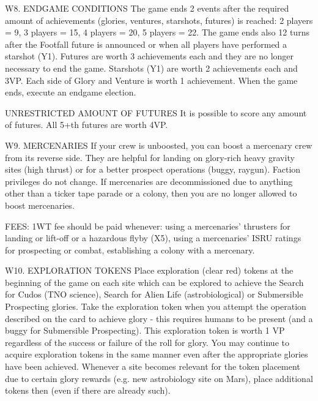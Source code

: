 \documentclass[a4paper]{book}
\begin{document}
W8. ENDGAME CONDITIONS
The game ends 2 events after the required amount of achievements (glories, ventures, starshots, futures) is reached: 2 players = 9, 3 players = 15, 4 players = 20, 5 players = 22. The game ends also 12 turns after the Footfall future is announced or when all players have performed a starshot (Y1).
Futures are worth 3 achievements each and they are no longer necessary to end the game.
Starshots (Y1) are worth 2 achievements each and 3VP.
Each side of Glory and Venture is worth 1 achievement.
When the game ends, execute an endgame election.

UNRESTRICTED AMOUNT OF FUTURES
It is possible to score any amount of futures. All 5+th futures are worth 4VP.


W9. MERCENARIES
If your crew is unboosted, you can boost a mercenary crew from its reverse side. They are helpful for landing on glory-rich heavy gravity sites (high thrust) or for a better prospect operations (buggy, raygun).
Faction privileges do not change.
If mercenaries are decommissioned due to anything other than a ticker tape parade or a colony, then you are no longer allowed to boost mercenaries.

FEES:
1WT fee should be paid whenever:
using a mercenaries’ thrusters for landing or lift-off or a hazardous flyby (X5),
using a mercenaries’ ISRU ratings for prospecting or combat,
establishing a colony with a mercenary.

W10. EXPLORATION TOKENS
Place exploration (clear red) tokens at the beginning of the game on each site which can be explored to achieve the Search for Cudos (TNO science), Search for Alien Life (astrobiological) or Submersible Prospecting glories. Take the exploration token when you attempt the operation described on the card to achieve glory - this requires humans to be present (and a buggy for Submersible Prospecting). This exploration token is worth 1 VP regardless of the success or failure of the roll for glory. You may continue to acquire exploration tokens in the same manner even after the appropriate glories have been achieved.
Whenever a site becomes relevant for the token placement due to certain glory rewards (e.g. new astrobiology site on Mars), place additional tokens then (even if there are already such).
\end{document}

